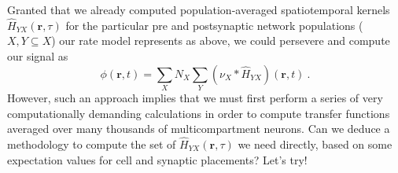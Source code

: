 Granted that we already computed population-averaged spatiotemporal kernels $\hat{H}_{YX}(\mathbf{r}, \tau)$ for the particular pre and postsynaptic network populations ($X, Y \subseteq X$) our rate model represents as above, 
we could persevere and compute our signal as
\begin{equation}
\phi(\mathbf{r}, t) = \sum_X N_X \sum_Y \left( \nu_X \ast \hat{H}_{YX} \right)(\mathbf{r}, t) ~.
\end{equation}
However, such an approach implies that we must first perform a series of very computationally demanding calculations 
in order to compute transfer functions averaged over many thousands of multicompartment neurons. 
Can we deduce a methodology to compute the set of $\hat{H}_{YX}(\mathbf{r}, \tau)$ we need directly, 
based on some expectation values for cell and synaptic placements? 
Let's try!

